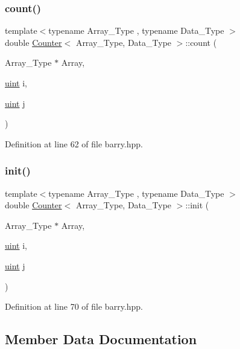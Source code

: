 \subsubsection{\texorpdfstring{count()}{count()}}
{\footnotesize\ttfamily template$<$typename Array\+\_\+\+Type , typename Data\+\_\+\+Type $>$ \\
double \hyperlink{classbarry_1_1_counter}{Counter}$<$ Array\+\_\+\+Type, Data\+\_\+\+Type $>$\+::count (\begin{DoxyParamCaption}\item[{Array\+\_\+\+Type $\ast$}]{Array,  }\item[{\hyperlink{namespacebarry_a11dfc53ddb4672278319aa04f1e09a6c}{uint}}]{i,  }\item[{\hyperlink{namespacebarry_a11dfc53ddb4672278319aa04f1e09a6c}{uint}}]{j }\end{DoxyParamCaption})\hspace{0.3cm}{\ttfamily [inline]}}



Definition at line 62 of file barry.\+hpp.

\mbox{\label{classbarry_1_1_counter_ae0451979ddc51a5fbf00de78c37d3216}} 
\subsubsection{\texorpdfstring{init()}{init()}}
{\footnotesize\ttfamily template$<$typename Array\+\_\+\+Type , typename Data\+\_\+\+Type $>$ \\
double \hyperlink{classbarry_1_1_counter}{Counter}$<$ Array\+\_\+\+Type, Data\+\_\+\+Type $>$\+::init (\begin{DoxyParamCaption}\item[{Array\+\_\+\+Type $\ast$}]{Array,  }\item[{\hyperlink{namespacebarry_a11dfc53ddb4672278319aa04f1e09a6c}{uint}}]{i,  }\item[{\hyperlink{namespacebarry_a11dfc53ddb4672278319aa04f1e09a6c}{uint}}]{j }\end{DoxyParamCaption})\hspace{0.3cm}{\ttfamily [inline]}}



Definition at line 70 of file barry.\+hpp.



\subsection{Member Data Documentation}
\mbox{\label{classbarry_1_1_counter_aa535e164838a3a9c780e8d15fe45679b}} 
